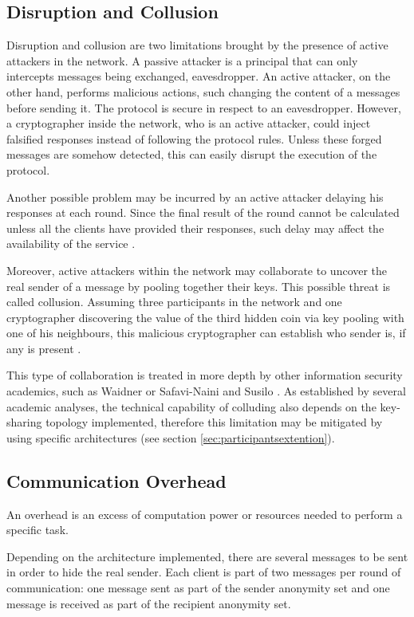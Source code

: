 \subsection{Disruption and Collusion} \label{sec:disruptionlimitation}
Disruption and collusion are two limitations brought by the presence of active attackers in the network. A passive attacker is a principal that can only intercepts messages being exchanged, eavesdropper. An active attacker, on the other hand, performs malicious actions, such changing the content of a messages before sending it. The protocol is secure in respect to an eavesdropper. However, a cryptographer inside the network, who is an active attacker, could inject falsified responses instead of following the protocol rules. Unless these forged messages are somehow detected, this can easily disrupt the execution of the protocol.

Another possible problem may be incurred by an active attacker delaying his responses at each round. Since the final result of the round cannot be calculated unless all the clients have provided their responses, such delay may affect the availability of the service \cite{Fischer}.

Moreover, active attackers within the network may collaborate to uncover the real sender of a message by pooling together their keys. This possible threat is called collusion. Assuming three participants in the network and one cryptographer discovering the value of the third hidden coin via key pooling with one of his neighbours, this malicious cryptographer can establish who sender is, if any is present \cite{Chaum}. 

This type of collaboration is treated in more depth by other information security academics, such as Waidner \cite{Waidner} or Safavi-Naini and Susilo \cite{Susilo}. As established by several academic analyses, the technical capability of colluding also depends on the key-sharing topology implemented, therefore this limitation may be mitigated by using specific architectures (see section \ref{sec:participantsextention}). 


\subsection{Communication Overhead} \label{sec:complexitylimitation}
An overhead is an excess of computation power or resources needed to perform a specific task. 

Depending on the architecture implemented, there are several messages to be sent in order to hide the real sender. Each client is part of two messages per round of communication: one message sent as part of the sender anonymity set and one message is received as part of the recipient anonymity set.

